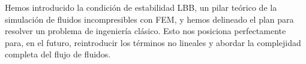 Hemos introducido la condición de estabilidad LBB, un pilar teórico de la simulación de fluidos incompresibles con FEM, y hemos delineado el plan para resolver un problema de ingeniería clásico. Esto nos posiciona perfectamente para, en el futuro, reintroducir los términos no lineales y abordar la complejidad completa del flujo de fluidos.
